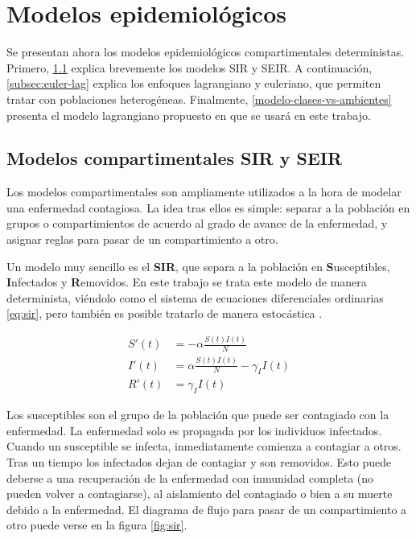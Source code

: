

\section{Modelos epidemiológicos}\label{sec:epi-model}

Se presentan ahora los modelos epidemiológicos compartimentales deterministas. Primero, \ref{subsec:sir-seir} explica brevemente los modelos SIR y SEIR. A continuación, \ref{subsec:euler-lag} explica los enfoques lagrangiano y euleriano, que permiten tratar con poblaciones heterogéneas. Finalmente, \ref{modelo-clases-vs-ambientes} presenta el modelo lagrangiano propuesto en \cite{Bichara2018} que se usará en este trabajo.

\subsection{Modelos compartimentales SIR y SEIR}\label{subsec:sir-seir}

Los modelos compartimentales son ampliamente utilizados a la hora de modelar una enfermedad contagiosa. La idea tras ellos es simple: separar a la población en grupos o compartimientos de acuerdo al grado de avance de la enfermedad, y asignar reglas para pasar de un compartimiento a otro.

Un modelo muy sencillo es el \textbf{SIR}, que separa a la población en \textbf{S}usceptibles, \textbf{I}nfectados y \textbf{R}emovidos. En este trabajo se trata este modelo de manera determinista, viéndolo como el sistema de ecuaciones diferenciales ordinarias \ref{eq:sir}, pero también es posible tratarlo de manera estocástica \cite{Daley1984}.

\begin{equation}
\label{eq:sir}
\begin{aligned}
S'(t) &=  -\alpha \frac{S(t)I(t)}{N} \\
I'(t) &= \alpha \frac{S(t)I(t)}{N}- \gamma_I I(t) \\
R'(t) &= \gamma_I I(t)
\end{aligned}
\end{equation}

Los susceptibles son el grupo de la población que puede ser contagiado con la enfermedad. La enfermedad solo es propagada por los individuos infectados. Cuando un susceptible se infecta, inmediatamente comienza a contagiar a otros. Tras un tiempo los infectados dejan de contagiar y son removidos. Esto puede deberse a una recuperación de la enfermedad con inmunidad completa (no pueden volver a contagiarse), al aislamiento del contagiado o bien a su muerte debido a la enfermedad. El diagrama de flujo para pasar de un compartimiento a otro puede verse en la figura \ref{fig:sir}.

